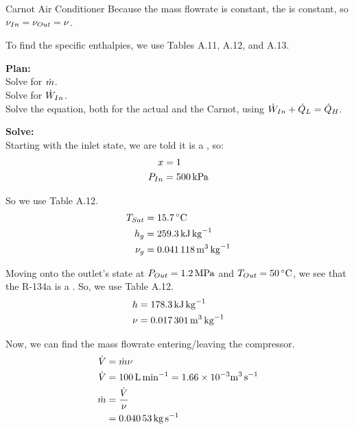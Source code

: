 \begin{example}{Carnot Air Conditioner}
  Because the mass flowrate is constant, the  is constant, so $\nu_{In} = \nu_{Out} = \nu$.

  To find the specific enthalpies, we use Tables A.11, A.12, and A.13.

  \textbf{Plan:} \\
  Solve for $\dot{m}$. \\
  Solve for $\dot{W}_{In}$. \\
  Solve the  equation, both for the actual and the Carnot, using $\dot{W}_{In} + \dot{Q}_{L} = \dot{Q}_{H}$.

  \textbf{Solve:} \\
  Starting with the inlet state, we are told it is a , so:
  \begin{align*}
    x &= 1 \\
    P_{In} &= \SI{500}{\kilo\pascal}
  \end{align*}

  So we use Table A.12.
  \begin{align*}
    \Temp_{Sat} &= \SI{15.7}{\degreeCelsius} \\
    \Vapor{\SpecificEnthalpy} &= \SI{259.3}{\kilo\joule\per\kilo\gram} \\
    \Vapor{\SpecificVolume} &= \SI{0.041118}{\meter\cubed\per\kilo\gram}
  \end{align*}

  Moving onto the outlet's state at $P_{Out} = \SI{1.2}{\mega\pascal}$ and $\Temp_{Out} = \SI{50}{\degreeCelsius}$, we see that the R-134a is a .
  So, we use Table A.12.
  \begin{align*}
    h &= \SI{178.3}{\kilo\joule\per\kilo\gram} \\
    \nu &= \SI{0.017301}{\meter\cubed\per\kilo\gram}
  \end{align*}

  Now, we can find the mass flowrate entering/leaving the compressor.
  \begin{align*}
    \dot{V} &= \dot{m} \nu \\
    \dot{V} &= \SI{100}{\liter\per\minute} = 1.66 \times 10^{-3} \si{\meter\cubed\per\second} \\
    \dot{m} &= \frac{\dot{V}}{\nu} \\
                       &= \SI{0.04053}{\kilo\gram\per\second}
  \end{align*}


\end{example}
